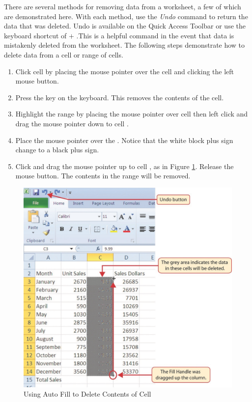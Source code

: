There are several methods for removing data from a worksheet, a few of which are demonstrated here. With each method, use the \textit{Undo} command to return the data that was deleted. Undo is available on the Quick Access Toolbar or use the keyboard shortcut of  $ + $ .This is a helpful command in the event that data is mistakenly deleted from the worksheet. The following steps demonstrate how to delete data from a cell or range of cells.

\begin{enumerate}
	\item Click cell  by placing the mouse pointer over the cell and clicking the left mouse button.
	\item Press the  key on the keyboard. This removes the contents of the cell.
	\item Highlight the range  by placing the mouse pointer over cell  then left click and drag the mouse pointer down to cell .
	\item Place the mouse pointer over the . Notice that the white block plus sign change to a black plus sign.
	\item Click and drag the mouse pointer up to cell , as in Figure \ref{01:fig21}. Release the mouse button. The contents in the range  will be removed.
\end{enumerate}

\begin{figure}[H]
	\centering
	\includegraphics[width=\maxwidth{.95\linewidth}]{gfx/ch01_fig21}
	\caption{Using Auto Fill to Delete Contents of Cell}
	\label{01:fig21}
\end{figure}


